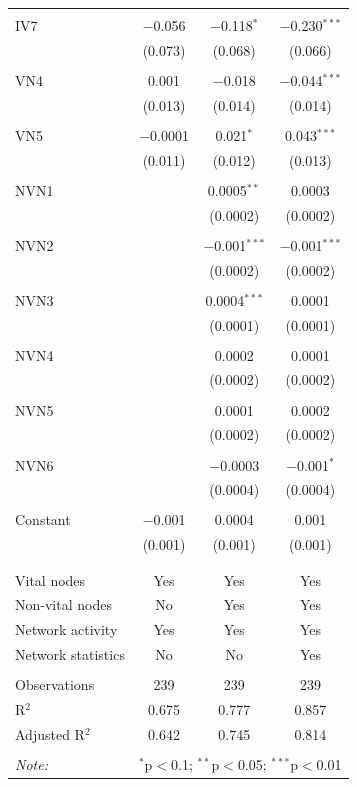 \begin{table}[!htbp]
\begin{tabular}{@{\extracolsep{5pt}}lccc}
  & & & \\ 
 IV7 & $-$0.056 & $-$0.118$^{*}$ & $-$0.230$^{***}$ \\ 
  & (0.073) & (0.068) & (0.066) \\ 
  & & & \\ 
 VN4 & 0.001 & $-$0.018 & $-$0.044$^{***}$ \\ 
  & (0.013) & (0.014) & (0.014) \\ 
  & & & \\ 
 VN5 & $-$0.0001 & 0.021$^{*}$ & 0.043$^{***}$ \\ 
  & (0.011) & (0.012) & (0.013) \\ 
  & & & \\ 
 NVN1 &  & 0.0005$^{**}$ & 0.0003 \\ 
  &  & (0.0002) & (0.0002) \\ 
  & & & \\ 
 NVN2 &  & $-$0.001$^{***}$ & $-$0.001$^{***}$ \\ 
  &  & (0.0002) & (0.0002) \\ 
  & & & \\ 
 NVN3 &  & 0.0004$^{***}$ & 0.0001 \\ 
  &  & (0.0001) & (0.0001) \\ 
  & & & \\ 
 NVN4 &  & 0.0002 & 0.0001 \\ 
  &  & (0.0002) & (0.0002) \\ 
  & & & \\ 
 NVN5 &  & 0.0001 & 0.0002 \\ 
  &  & (0.0002) & (0.0002) \\ 
  & & & \\ 
 NVN6 &  & $-$0.0003 & $-$0.001$^{*}$ \\ 
  &  & (0.0004) & (0.0004) \\ 
  & & & \\ 
 Constant & $-$0.001 & 0.0004 & 0.001 \\ 
  & (0.001) & (0.001) & (0.001) \\ 
  & & & \\ 
\hline \\[-1.8ex] 
Vital nodes & Yes & Yes & Yes \\ 
Non-vital nodes & No & Yes & Yes \\ 
Network activity & Yes & Yes & Yes \\ 
Network statistics & No & No & Yes \\ 
\hline &  &  &  \\ 
Observations & 239 & 239 & 239 \\ 
R$^{2}$ & 0.675 & 0.777 & 0.857 \\ 
Adjusted R$^{2}$ & 0.642 & 0.745 & 0.814 \\ 
\hline 
\hline \\[-1.8ex] 
\textit{Note:}  & \multicolumn{3}{r}{$^{*}$p$<$0.1; $^{**}$p$<$0.05; $^{***}$p$<$0.01} \\ 
\end{tabular} 
\end{table} 
